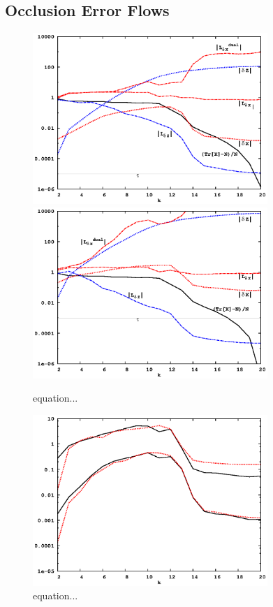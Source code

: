 \documentclass[letterpaper,twocolumn,amsmath,amsfont,amssymb,english,aps,jcp,preprintnumbers,groupaddress,nofootinbib,tightenlines]{revtex4}
\begin{document}
\subsection{Occlusion Error Flows}
\begin{figure}[h]
  \caption{equation...}
 \includegraphics[width=3.5in]{8x_33_nanotube_cond10_tau-5.eps}
 \includegraphics[width=3.5in]{8x_33_nanotube_cond10_tau-3.eps}
\end{figure}
\begin{figure}[h]
  \caption{equation...}
 \includegraphics[width=3.5in]{8x_33_nanotube_cond10_compare_errors.eps}
\end{figure}
\end{document}
